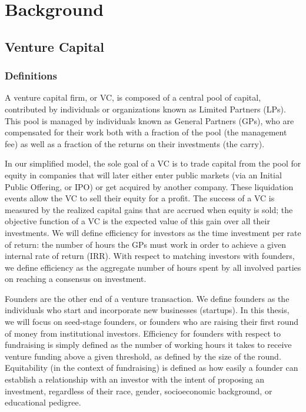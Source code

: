 \chapter{Background}
\label{ch:ch2}

\section{Venture Capital}

\subsection{Definitions}
\label{ch2:definitions}

A venture capital firm, or VC, is composed of a central pool of capital, contributed by individuals or organizations known as Limited Partners (LPs). This pool is managed by individuals known as General Partners (GPs), who are compensated for their work both with a fraction of the pool (the management fee) as well as a fraction of the returns on their investments (the carry).

In our simplified model, the sole goal of a VC is to trade capital from the pool for equity in companies that will later either enter public markets (via an Initial Public Offering, or IPO) or get acquired by another company. These liquidation events allow the VC to sell their equity for a profit. The success of a VC is measured by the realized capital gains that are accrued when equity is sold; the objective function of a VC is the expected value of this gain over all their investments. We will define efficiency for investors as the time investment per rate of return: the number of hours the GPs must work in order to achieve a given internal rate of return (IRR). With respect to matching investors with founders, we define efficiency as the aggregate number of hours spent by all involved parties on reaching a consensus on investment.

Founders are the other end of a venture transaction. We define founders as the individuals who start and incorporate new businesses (startups). In this thesis, we will focus on seed-stage founders, or founders who are raising their first round of money from institutional investors. Efficiency for founders with respect to fundraising is simply defined as the number of working hours it takes to receive venture funding above a given threshold, as defined by the size of the round. Equitability (in the context of fundraising) is defined as how easily a founder can establish a relationship with an investor with the intent of proposing an investment, regardless of their race, gender, socioeconomic background, or educational pedigree.

